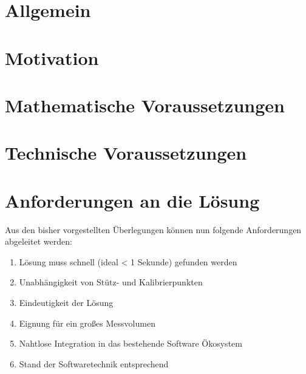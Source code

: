 %
\section[Allgemein]{Allgemein}

%
\section[Motivation]{Motivation}

%
%
\section[Mathematische Voraussetzungen]{Mathematische Voraussetzungen}

%
%
\section[Technische Voraussetzungen]{Technische Voraussetzungen}

%
\section[Anforderungen]{Anforderungen an die Lösung}
%
Aus den bisher vorgestellten Überlegungen können nun folgende Anforderungen abgeleitet werden:
%
\begin{enumerate}
	\item Lösung muss schnell (ideal < 1 Sekunde) gefunden werden
	\item Unabhängigkeit von Stütz- und Kalibrierpunkten
	\item Eindeutigkeit der Lösung
	\item Eignung für ein großes Messvolumen
	\item Nahtlose Integration in das bestehende Software Ökosystem
	\item Stand der Softwaretechnik entsprechend
%
\end{enumerate}
%
